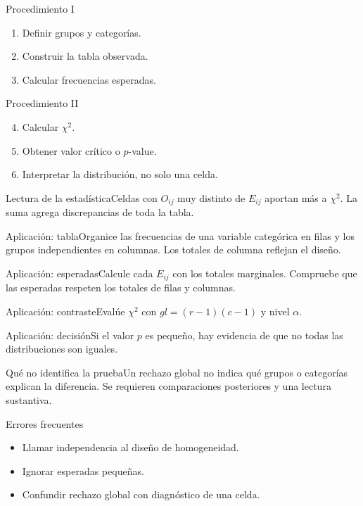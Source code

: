 \documentclass[10pt,aspectratio=169]{beamer}
\begin{document}
\begin{frame}{Procedimiento I}\small\begin{enumerate}\item Definir grupos y categorías.\item Construir la tabla observada.\item Calcular frecuencias esperadas.\end{enumerate}\end{frame}
\begin{frame}{Procedimiento II}\small\begin{enumerate}\setcounter{enumi}{3}\item Calcular $\chi^2$.\item Obtener valor crítico o $p$-value.\item Interpretar la distribución, no solo una celda.\end{enumerate}\end{frame}
\begin{frame}{Lectura de la estadística}\small Celdas con $O_{ij}$ muy distinto de $E_{ij}$ aportan más a $\chi^2$. La suma agrega discrepancias de toda la tabla.\end{frame}
\begin{frame}{Aplicación: tabla}\small Organice las frecuencias de una variable categórica en filas y los grupos independientes en columnas. Los totales de columna reflejan el diseño.\end{frame}
\begin{frame}{Aplicación: esperadas}\small Calcule cada $E_{ij}$ con los totales marginales. Compruebe que las esperadas respeten los totales de filas y columnas.\end{frame}
\begin{frame}{Aplicación: contraste}\small Evalúe $\chi^2$ con $gl=(r-1)(c-1)$ y nivel $\alpha$.\end{frame}
\begin{frame}{Aplicación: decisión}\small Si el valor $p$ es pequeño, hay evidencia de que no todas las distribuciones son iguales.\end{frame}
\begin{frame}{Qué no identifica la prueba}\small Un rechazo global no indica qué grupos o categorías explican la diferencia. Se requieren comparaciones posteriores y una lectura sustantiva.\end{frame}
\begin{frame}{Errores frecuentes}\small\begin{itemize}\item Llamar independencia al diseño de homogeneidad.\item Ignorar esperadas pequeñas.\item Confundir rechazo global con diagnóstico de una celda.\end{itemize}\end{frame}
\end{document}
